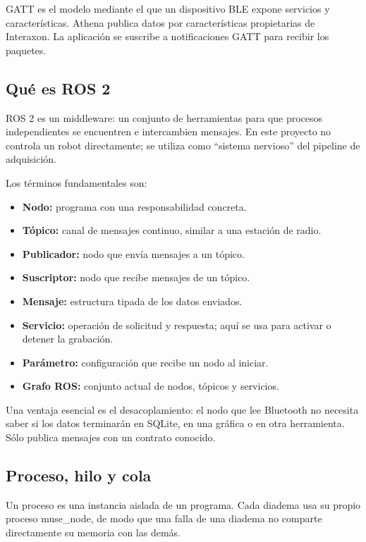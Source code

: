 \documentclass[11pt,a4paper]{article}
\begin{document}
GATT es el modelo mediante el que un dispositivo BLE expone servicios y características. Athena publica datos por características propietarias de Interaxon. La aplicación se suscribe a notificaciones GATT para recibir los paquetes.

\subsection{Qué es ROS 2}

ROS 2 es un middleware: un conjunto de herramientas para que procesos independientes se encuentren e intercambien mensajes. En este proyecto no controla un robot directamente; se utiliza como “sistema nervioso” del pipeline de adquisición.

Los términos fundamentales son:

\begin{itemize}
\item \textbf{Nodo:} programa con una responsabilidad concreta.
\item \textbf{Tópico:} canal de mensajes continuo, similar a una estación de radio.
\item \textbf{Publicador:} nodo que envía mensajes a un tópico.
\item \textbf{Suscriptor:} nodo que recibe mensajes de un tópico.
\item \textbf{Mensaje:} estructura tipada de los datos enviados.
\item \textbf{Servicio:} operación de solicitud y respuesta; aquí se usa para activar o detener
la grabación.

\item \textbf{Parámetro:} configuración que recibe un nodo al iniciar.
\item \textbf{Grafo ROS:} conjunto actual de nodos, tópicos y servicios.
\end{itemize}

Una ventaja esencial es el desacoplamiento: el nodo que lee Bluetooth no necesita saber si los datos terminarán en SQLite, en una gráfica o en otra herramienta. Sólo publica mensajes con un contrato conocido.

\subsection{Proceso, hilo y cola}

Un proceso es una instancia aislada de un programa. Cada diadema usa su propio proceso {\ttfamily\small muse\_node}, de modo que una falla de una diadema no comparte directamente su memoria con las demás.
\end{document}
